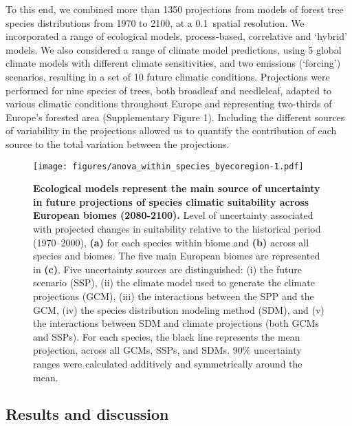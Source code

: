 \documentclass[11pt,letter]{article}
\begin{document}
To this end, we combined more than 1350 projections from models of forest tree species distributions from 1970 to 2100, at a 0.1\degree~spatial resolution. We incorporated a range of ecological models,  process-based, correlative and `hybrid' models. We also considered a range of climate model predictions, using 5 global climate models with different climate sensitivities, and two emissions (`forcing') scenarios, resulting in a set of 10 future climatic conditions. Projections were performed for nine species of trees, both broadleaf and needleleaf, adapted to various climatic conditions throughout Europe and representing two-thirds of Europe's forested area (Supplementary Figure 1). Including the different sources of variability in the projections allowed us to quantify the contribution of each source to the total variation between the projections. 

\begin{figure}
	\centering
	\texttt{[image: figures/anova\_within\_species\_byecoregion-1.pdf]}
	\caption{\textbf{Ecological models represent the main source of uncertainty in future projections of species climatic suitability across European biomes (2080-2100).} Level of uncertainty associated with projected changes in suitability relative to the historical period (1970–2000), \textbf{(a)} for each species within biome and \textbf{(b)} across all species and biomes. The five main European biomes are represented in \textbf{(c)}. Five uncertainty sources are distinguished: (i) the future scenario (SSP), (ii) the climate model used to generate the climate projections (GCM), (iii) the interactions between the SPP and the GCM, (iv) the species distribution modeling method (SDM), and (v) the interactions between SDM and climate projections (both GCMs and SSPs). For each species, the black line represents the mean projection, across all GCMs, SSPs, and SDMs. 90\% uncertainty ranges were calculated additively and symmetrically around the mean.}
	\label{fig:anovaspecies}  %
\end{figure}

\subsection*{Results and discussion}
\end{document}
